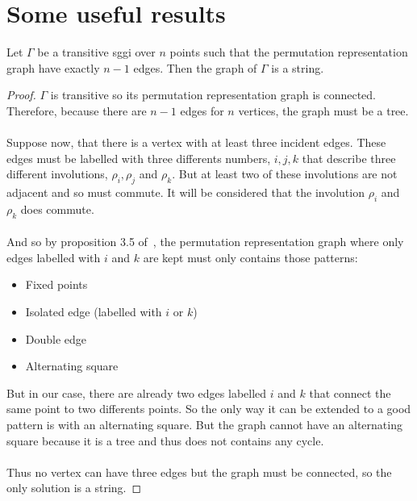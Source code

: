 \section{Some useful results}

\begin{lemma}\label{graphIsString}
  Let $\Gamma$ be a transitive sggi over $n$ points such that the permutation representation graph have exactly $n-1$ edges. Then the graph of $\Gamma$ is a string.
\end{lemma}

\begin{proof}
  $\Gamma$ is transitive so its permutation representation graph is connected. Therefore, because there are $n-1$ edges for $n$ vertices, the graph must be a tree.

  \paragraph{}
  Suppose now, that there is a vertex with at least three incident edges. These edges must be labelled with three differents numbers, $i, j, k$ that describe three different involutions, $\rho_i, \rho_j$ and $\rho_k$. But at least two of these involutions are not adjacent and so must commute. It will be considered that the involution $\rho_i$ and $\rho_k$ does commute.

  \paragraph{}
  And so by proposition 3.5 of~\cite{cprGraph}, the permutation representation graph where only edges labelled with $i$ and $k$ are kept must only contains those patterns:
  \begin{itemize}
    \item Fixed points
    \item Isolated edge (labelled with $i$ or $k$)
    \item Double edge
    \item Alternating square
  \end{itemize}
  But in our case, there are already two edges labelled $i$ and $k$ that connect the same point to two differents points. So the only way it can be extended to a good pattern is with an alternating square. But the graph cannot have an alternating square because it is a tree and thus does not contains any cycle.

  \paragraph{}
  Thus no vertex can have three edges but the graph must be connected, so the only solution is a string.
\end{proof}

